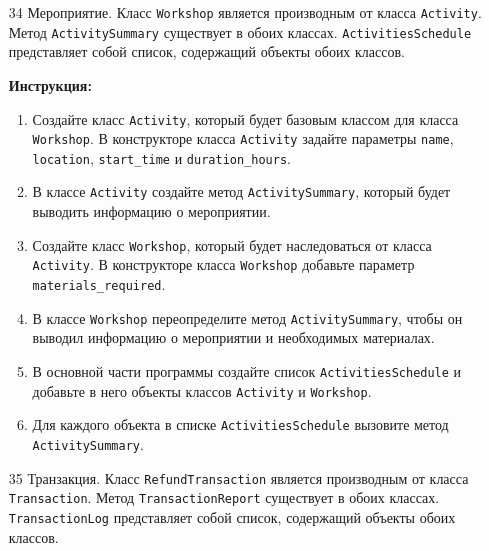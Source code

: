 \begin{enumerate}
\item[34]
Мероприятие. Класс \texttt{Workshop} является производным от класса \texttt{Activity}. Метод \texttt{ActivitySummary} существует в обоих классах. \texttt{ActivitiesSchedule} представляет собой список, содержащий объекты обоих классов.

\textbf{Инструкция:}
\begin{enumerate}
    \item Создайте класс \texttt{Activity}, который будет базовым классом для класса \texttt{Workshop}. В конструкторе класса \texttt{Activity} задайте параметры \texttt{name}, \texttt{location}, \texttt{start\_time} и \texttt{duration\_hours}.
    \item В классе \texttt{Activity} создайте метод \texttt{ActivitySummary}, который будет выводить информацию о мероприятии.
    \item Создайте класс \texttt{Workshop}, который будет наследоваться от класса \texttt{Activity}. В конструкторе класса \texttt{Workshop} добавьте параметр \texttt{materials\_required}.
    \item В классе \texttt{Workshop} переопределите метод \texttt{ActivitySummary}, чтобы он выводил информацию о мероприятии и необходимых материалах.
    \item В основной части программы создайте список \texttt{ActivitiesSchedule} и добавьте в него объекты классов \texttt{Activity} и \texttt{Workshop}.
    \item Для каждого объекта в списке \texttt{ActivitiesSchedule} вызовите метод \texttt{ActivitySummary}.
\end{enumerate}

\item[35]
Транзакция. Класс \texttt{RefundTransaction} является производным от класса \texttt{Transaction}. Метод \texttt{TransactionReport} существует в обоих классах. \texttt{TransactionLog} представляет собой список, содержащий объекты обоих классов.


\end{enumerate}
